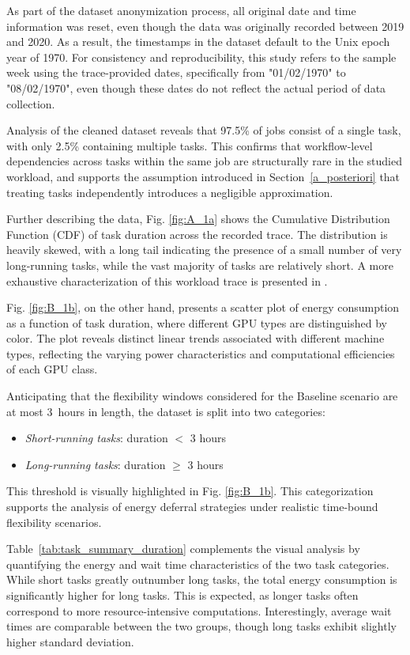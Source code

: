 \documentclass[preprint,12pt]{elsarticle}
\begin{document}
 
As part of the dataset anonymization process, all original date and time information was reset, even though the data was originally recorded between 2019 and 2020. As a result, the timestamps in the dataset default to the Unix epoch year of 1970. For consistency and reproducibility, this study refers to the sample week using the trace-provided dates, specifically from "01/02/1970" to "08/02/1970", even though these dates do not reflect the actual period of data collection.

Analysis of the cleaned dataset reveals that 97.5\% of jobs consist of a single task, with only 2.5\% containing multiple tasks. This confirms that workflow-level dependencies across tasks within the same job are structurally rare in the studied workload, and supports the assumption introduced in Section~\ref{a_posteriori} that treating tasks independently introduces a negligible approximation.

Further describing the data, Fig. \ref{fig:A_1a} shows the Cumulative Distribution Function (CDF) of task duration across the recorded trace. The distribution is heavily skewed, with a long tail indicating the presence of a small number of very long-running tasks, while the vast majority of tasks are relatively short. A more exhaustive characterization of this workload trace is presented in \cite{Weng2022}.

Fig. \ref{fig:B_1b}, on the other hand, presents a scatter plot of energy consumption as a function of task duration, where different GPU types are distinguished by color. The plot reveals distinct linear trends associated with different machine types, reflecting the varying power characteristics and computational efficiencies of each GPU class.

Anticipating that the flexibility windows considered for the Baseline scenario are at most 3~hours in length, the dataset is split into two categories:
\begin{itemize}
    \item \textit{Short-running tasks}: duration $<$ 3 hours
    \item \textit{Long-running tasks}: duration $\geq$ 3 hours
\end{itemize}

This threshold is visually highlighted in Fig. \ref{fig:B_1b}. This categorization supports the analysis of energy deferral strategies under realistic time-bound flexibility scenarios.

Table~\ref{tab:task_summary_duration} complements the visual analysis by quantifying the energy and wait time characteristics of the two task categories. While short tasks greatly outnumber long tasks, the total energy consumption is significantly higher for long tasks. This is expected, as longer tasks often correspond to more resource-intensive computations. Interestingly, average wait times are comparable between the two groups, though long tasks exhibit slightly higher standard deviation.
\end{document}
